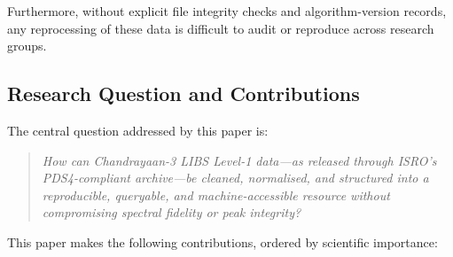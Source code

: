 \documentclass[a4paper,twocolumn,10pt]{article}
\begin{document}
Furthermore, without explicit file integrity checks and
algorithm-version records, any reprocessing of these data is
difficult to audit or reproduce across research groups.

\subsection{Research Question and Contributions}

The central question addressed by this paper is:

\begin{quote}
\emph{How can Chandrayaan-3 LIBS Level-1 data---as released through
ISRO's PDS4-compliant archive---be cleaned, normalised, and structured
into a reproducible, queryable, and machine-accessible resource
without compromising spectral fidelity or peak integrity?}
\end{quote}

This paper makes the following contributions, ordered by scientific
importance:
\end{document}

